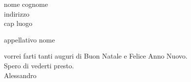 \documentclass[12pt]{article}
\begin{document}
\hskip10cm
\parbox{5cm}{
  nome cognome\\
  indirizzo\\
  cap luogo
  }
\vskip5cm

appellativo nome

vorrei farti tanti auguri di Buon Natale e Felice Anno Nuovo.\\
Spero di vederti presto.\\
\vskip1cm
Alessandro
\end{document}
